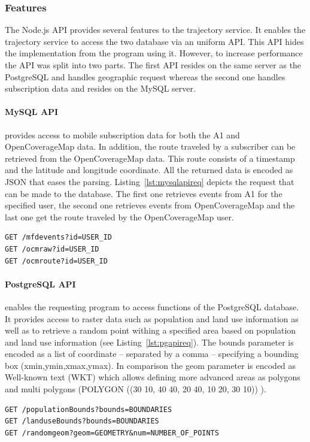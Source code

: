 \documentclass[master,english]{hgbthesis}
\begin{document}
\subsubsection{Features}
The Node.js API provides several features to the trajectory service. It enables the trajectory service to access the two database via an uniform API. This API hides the implementation from the program using it. However, to increase performance the API was split into two parts. The first API resides on the same server as the PostgreSQL and handles geographic request whereas the second one handles subscription data and resides on the MySQL server.
\paragraph{MySQL API}
provides access to mobile subscription data for both the A1 and OpenCoverageMap data. In addition, the route traveled by a subscriber can be retrieved from the OpenCoverageMap data. This route consists of a timestamp and the latitude and longitude coordinate. All the returned data is encoded as JSON that eases the parsing. Listing~\ref{lst:mysqlapireq} depicts the request that can be made to the database. The first one retrieves events from A1 for the specified user, the second one retrieves events from OpenCoverageMap and the last one get the route traveled by the OpenCoverageMap user.
\begin{lstlisting}[style=BashInputStyle,caption={MySQL API requests},label={lst:mysqlapireq}]
GET /mfdevents?id=USER_ID
GET /ocmraw?id=USER_ID
GET /ocmroute?id=USER_ID
\end{lstlisting}
\paragraph{PostgreSQL API}
enables the requesting program to access functions of the PostgreSQL database. It provides access to raster data such as population and land use information as well as to retrieve a random point withing a specified area based on population and land use information (see Listing~\ref{lst:pgapireq}). The bounds parameter is encoded as a list  of coordinate -- separated by a comma -- specifying a bounding box (xmin,ymin,xmax,ymax). In comparison the geom parameter is encoded as Well-known text (WKT) which allows defining more advanced areas as polygons and multi polygons (POLYGON ((30 10, 40 40, 20 40, 10 20, 30 10))
).
\begin{lstlisting}[style=BashInputStyle,caption={PostgreSQL API requests},label={lst:pgapireq}]
GET /populationBounds?bounds=BOUNDARIES
GET /landuseBounds?bounds=BOUNDARIES
GET /randomgeom?geom=GEOMETRY&num=NUMBER_OF_POINTS
\end{lstlisting}
\end{document}
